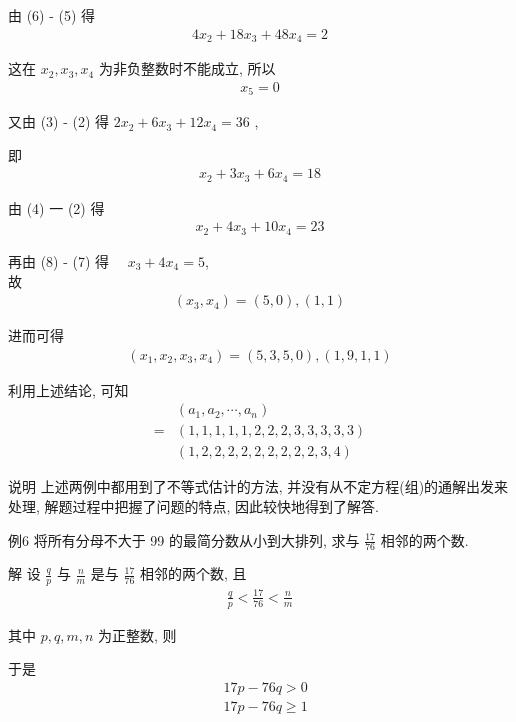 由 (6) - (5) 得
\begin{align*}
	4 x_{2}+18 x_{3}+48 x_{4}=2
\end{align*}

这在 $x_{2} ,  x_{3} ,  x_{4}$ 为非负整数时不能成立, 所以
\begin{align*}
	x_{5}=0
\end{align*}

又由 (3) - (2) 得 $2 x_{2}+6 x_{3}+12 x_{4}=36$ ,

即
\begin{align*}
	x_{2}+3 x_{3}+6 x_{4}=18
\end{align*}

由 (4) 一 (2) 得
\begin{align*}
	x_{2}+4 x_{3}+10 x_{4}=23
\end{align*}

再由 (8) - (7) 得 $\quad x_{3}+4 x_{4}=5$,\\
故
\begin{align*}
	\left(x_{3}, x_{4}\right)=(5,0),(1,1)
\end{align*}

进而可得
\begin{align*}
	\left(x_{1}, x_{2}, x_{3}, x_{4}\right)=(5,3,5,0),(1,9,1,1)
\end{align*}

利用上述结论, 可知\begin{align}
	  & \left(a_{1}, a_{2}, \cdots, a_{n}\right) \\
	= & (1,1,1,1,1,2,2,2,3,3,3,3,3)              \\
	  & (1,2,2,2,2,2,2,2,2,2,3,4)
\end{align}

说明 上述两例中都用到了不等式估计的方法, 并没有从不定方程(组)的通解出发来处理, 解题过程中把握了问题的特点, 因此较快地得到了解答.

例6 将所有分母不大于 99 的最简分数从小到大排列, 求与 $\frac{17}{76}$ 相邻的两个数.

解 设 $\frac{q}{p}$ 与 $\frac{n}{m}$ 是与 $\frac{17}{76}$ 相邻的两个数, 且
\begin{align*}
	\frac{q}{p}<\frac{17}{76}<\frac{n}{m}
\end{align*}

其中 $p ,  q ,  m ,  n$ 为正整数, 则

于是\begin{align}
	 & 17 p-76 q>0           \\
	 & 17 p-76 q \geqslant 1
\end{align}

